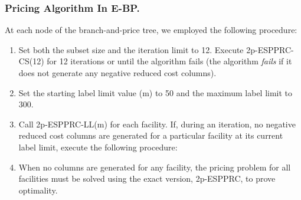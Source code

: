 \subsubsection{Pricing Algorithm In E-BP.}
\label{pri-E-BP}
 At each node of the branch-and-price tree, we employed the following procedure:
\begin{enumerate}
\item Set both the subset size and the iteration limit to 12. Execute 2p-ESPPRC-CS(12) for 
12 iterations or until the algorithm fails (the algorithm {\it fails} if it does not 
generate any negative reduced cost columns).
\item Set the starting label limit value (m) to 50 and the maximum label limit
to 300.  
\item Call 2p-ESPPRC-LL(m) for each facility. If, during an iteration, no negative reduced 
cost columns are generated for a particular facility at its current label limit, 
execute the following procedure:
\item  When no columns are generated for any facility, the pricing problem for all facilities 
must be solved using the exact version, 2p-ESPPRC, to prove optimality.
\end{enumerate}

